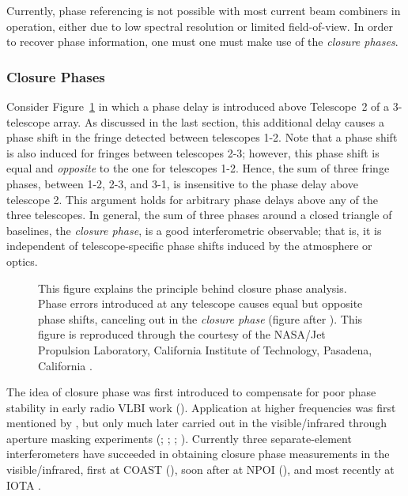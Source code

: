 \documentclass[12pt]{iopart}
\begin{document}
Currently, phase referencing is not possible with most current beam
combiners in operation, either due to low spectral resolution or
limited field-of-view.  In order to recover phase information, one must
one must make use of the {\em closure phases}.


\subsubsection{Closure Phases}
\label{closurephase}
Consider Figure~\ref{monnier_fig_3} in which a phase delay is
introduced above Telescope~2 of a 3-telescope array.  As discussed
in the last section, this additional
delay causes
a phase shift in the fringe detected between telescopes 1-2.
Note that a phase shift is also
induced for fringes between telescopes 2-3; however, this phase shift
is equal and {\em opposite} to the one for telescopes 1-2.  Hence, the
sum of three fringe phases, between 1-2, 2-3, and 3-1, is insensitive
to the phase delay above telescope 2.  This argument holds for
arbitrary phase delays above any of the three telescopes.  In general,
the sum of three phases around a closed triangle of baselines, the
{\em closure phase}, is a good interferometric observable; that is, it
is independent of telescope-specific phase shifts induced by the
atmosphere or optics.


\begin{figure}
\begin{center}


\centerline{}
\caption{This figure explains the principle behind closure phase analysis.
Phase errors introduced at any telescope causes equal but opposite phase
shifts, canceling out in the {\em closure phase} 
(figure after \citealt{readhead88}).  This figure is reproduced 
through the courtesy
of the NASA/Jet Propulsion Laboratory,
California Institute of Technology, Pasadena, California \citep{monnier_mss}.
\label{monnier_fig_3}}
\end{center}
\end{figure}

The idea of closure phase was first introduced to compensate for poor
phase stability in early radio VLBI work (\citealt{jennison58}).
Application at higher frequencies was first mentioned by
\cite{rogstad68}, but only much later carried out in the
visible/infrared through aperture masking experiments
(\citealt{baldwin86}; \citealt{haniff87}; \citealt{readhead88};
\citealt{haniff89}).  Currently three separate-element interferometers
have succeeded in obtaining closure phase measurements in the
visible/infrared, first at COAST (\citealt{coast96}), soon after at
NPOI (\citealt{npoi97}), and most recently at IOTA \citep{traub2002}.
\end{document}
